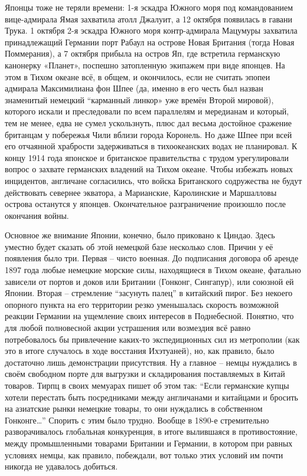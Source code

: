 Японцы тоже не теряли времени: 1-я эскадра Южного моря под командованием вице-адмирала Ямая захватила атолл Джалуит, а 12 октября появилась в гавани Трука. 1 октября 2-я эскадра Южного моря контр-адмирала Мацумуры захватила принадлежащий Германии порт Рабаул на острове Новая Британия (тогда Новая Поммерания), а 7 октября прибыла на остров Яп, где встретила германскую канонерку «Планет», поспешно затопленную экипажем при виде японцев. На этом в Тихом океане всё, в общем, и окончилось, если не считать эпопеи адмирала Максимилиана фон Шпее (да, именно в его честь был назван знаменитый немецкий “карманный линкор» уже времён Второй мировой), которого искали и преследовали по всем параллелям и мередианам и который, тем не менее, едва не сумел ускользнуть, плюс дал весьма достойное сражение британцам у побережья Чили вблизи города Коронель. Но даже Шпее при всей его отчаянной храбрости задерживаться в тихоокеанских водах не планировал. К концу 1914 года японское и британское правительства с трудом урегулировали вопрос о захвате германских владений на Тихом океане. Чтобы избежать новых инцидентов, англичане согласились, что войска Британского содружества не будут действовать севернее экватора, а Марианские, Каролинские и Маршалловы острова останутся у японцев. Окончательное разграничение произошло после окончания войны.

Основное же внимание Японии, конечно, было приковано к Циндао. Здесь уместно будет сказать об этой немецкой базе несколько слов. Причин у её появления было три. Первая – чисто военная. До подписания договора об аренде 1897 года любые немецкие морские силы, находящиеся в Тихом океане, фатально зависели от портов и доков или Британии (Гонконг, Сингапур), или союзной ей Японии. Вторая – стремление “засунуть палец” в китайский пирог. Без некоего опорного пункта на его территории резко уменьшалась скорость возможной реакции Германии на ущемление своих интересов в Поднебесной. Понятно, что для любой полновесной акции устрашения или возмездия всё равно потребовалось бы привлечение каких-то экспедиционных сил из метрополии (как это в итоге случалось в ходе восстания Ихэтуаней), но, как правило, было достаточно лишь демонстрации присутствия. Ну а главное – немцы нуждались в своём свободном порте для выгрузки и складирования поставляемых в Китай товаров. Тирпц в своих мемуарах пишет об этом так: “Если германские купцы хотели перестать быть посредниками между англичанами и китайцами и бросить на азиатские рынки немецкие товары, то они нуждались в собственном Гонконге…” Спорить с этим было трудно. Вообще в 1890-е стремительно разворачивалось глобальная конкуренция, в итоге вылившаяся в противостояние, между промышленными товарами Британии и Германии, в котором при равных условиях немцы, как правило, побеждали, вот только этих условий им почти никогда не удавалось добиться.

